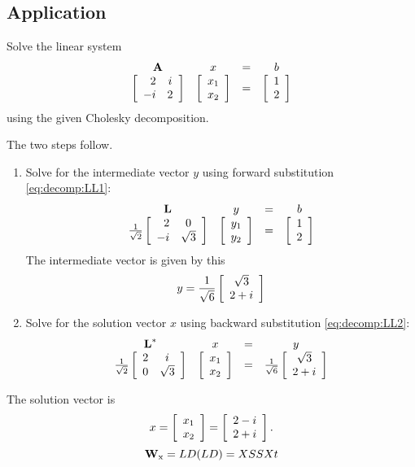 \subsection{Application}
Solve the linear system
\begin{equation}
  \begin{array}{cccc}
    \A{}&x&=&b\\
    \mat{rc}
    {
  2 & i \\
 -i & 2
    }
    &
    \mat{c}{x_{1}\\x_{2}}
    &=&
    \mat{c}{1\\2}
  \end{array}
\end{equation}
using the given Cholesky decomposition.

The two steps follow.
\begin{enumerate}
\item Solve for the intermediate vector $y$ using forward substitution \eqref{eq:decomp:LL1}:
\begin{equation}
  \begin{array}{cccc}
    \LL{} & y & = & b \\
    \frac{1}{\sqrt{2}}\mat{rc}
{
 2 & 0 \\
 -i & \sqrt{3}
}
    & \mat{c}{y_{1}\\y_{2}} & = &
    \mat{c}{1\\2}
  \end{array}
\end{equation}
The intermediate vector is given by this
\begin{equation}
  y = \frac{1}{\sqrt{6}}\mat{c}{\sqrt{3}\\2+i}
\end{equation}
\item Solve for the solution vector $x$ using backward substitution \eqref{eq:decomp:LL2}:
\begin{equation}
  \begin{array}{cccc}
    \LL{*} & x & = & y \\
    \frac{1}{\sqrt{2}}
\mat{rc}
{
 2 & i \\
 0 & \sqrt{3}
}
    & \mat{c}{x_{1}\\x_{2}} & = &
    \frac{1}{\sqrt{6}}\mat{c}{\sqrt{3}\\2+i}
  \end{array}
\end{equation}
\end{enumerate}
The solution vector is
\begin{equation}
  x = \mat{c}{x_{1}\\x_{2}} = \mat{c}{2-i\\2+i}.
\end{equation}
\begin{equation}
  \W{x}=LD(LD)=XSSXt
\end{equation}


\endinput